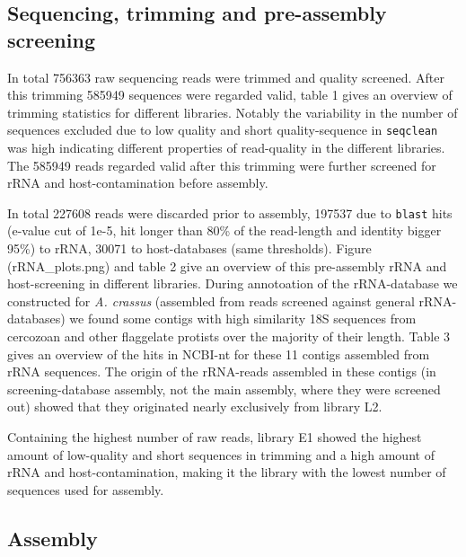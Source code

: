 \documentclass[10pt]{bmc_article}
\newenvironment{bmcformat}{\begin{raggedright}\baselineskip20pt\sloppy\setboolean{publ}{false}}{\end{raggedright}\baselineskip20pt\sloppy}
\begin{document}
\begin{bmcformat}
 \subsection*{Sequencing, trimming and pre-assembly screening}


In total 756363 raw sequencing reads were
trimmed and quality screened. After this trimming
585949 sequences were regarded valid, table 1
gives an overview of trimming statistics for different
libraries. Notably the variability in the number of sequences excluded
due to low quality and short quality-sequence in \texttt{seqclean} was
high indicating different properties of read-quality in the different
libraries. The 585949 reads regarded valid
after this trimming were further screened for rRNA and
host-contamination before assembly.





In total 227608 reads were discarded prior to assembly,
197537 due to \texttt{blast} hits (e-value cut of 1e-5,
hit longer than 80\% of the read-length and identity bigger 95\%) to
rRNA, 30071 to host-databases (same thresholds). Figure
(rRNA\_plots.png) and table 2 give an overview of this pre-assembly
rRNA and host-screening in different libraries. During annotoation of
the rRNA-database we constructed for \textit{A. crassus} (assembled
from reads screened against general rRNA-databases) we found some
contigs with high similarity 18S sequences from cercozoan and other
flaggelate protists over the majority of their length. Table 3 gives
an overview of the hits in NCBI-nt for these 11 contigs assembled from
rRNA sequences. The origin of the rRNA-reads assembled in these
contigs (in screening-database assembly, not the main assembly, where
they were screened out) showed that they originated nearly exclusively
from library L2.
 
Containing the highest number of raw reads, library E1 showed the
highest amount of low-quality and short sequences in trimming and a
high amount of rRNA and host-contamination, making it the library with
the lowest number of sequences used for assembly.

\subsection*{Assembly}



\end{bmcformat}
\end{document}
